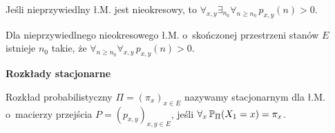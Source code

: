 	\begin{fact}
		Jeśli nieprzywiedlny ł.M. jest nieokresowy, to
		$\forall_{x,y} \exists_{n_0} \forall_{n \geq n_0}\, 
			p_{x,y}(n) > 0$.
	\end{fact}
	
	\begin{corollary}
		Dla nieprzywiedlnego nieokresowego ł.M. o~skończonej 
		przestrzeni stanów $E$ istnieje $n_0$ takie, że
		$\forall_{n \geq n_0} \forall_{x,y}\, p_{x,y}(n) > 0$.
	\end{corollary}
	
	{\bf Rozkłady stacjonarne}
	\begin{definition}
		Rozkład probabilistyczny $\Pi = (\pi_x)_{x \in E}$
		nazywamy stacjonarnym dla ł.M. o~macierzy przejścia
		$P = (p_{x,y})_{x,y \in E}$, jeśli 
		$\forall_x\, \P_\Pi(X_1 = x) = \pi_x$.
	\end{definition}















 
 
